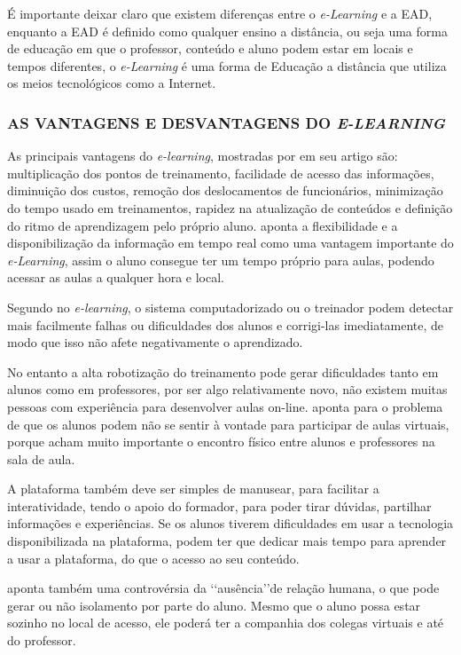 \par
É importante deixar claro que existem diferenças entre o \textit{e-Learning} e a EAD, enquanto a EAD é definido como qualquer ensino a distância, ou seja uma forma de educação em que o professor, conteúdo e aluno podem estar em locais e tempos diferentes, o \textit{e-Learning} é uma forma de Educação a distância que utiliza os meios tecnológicos como a Internet.


\subsubsection{AS VANTAGENS E DESVANTAGENS DO \textit{E-LEARNING}}
As principais vantagens do \textit{e-learning}, mostradas por  em seu artigo são: multiplicação dos pontos de treinamento, facilidade de acesso das informações, diminuição dos custos, remoção dos deslocamentos de funcionários, minimização do tempo usado em treinamentos, rapidez na atualização de conteúdos e definição do ritmo de aprendizagem pelo próprio aluno.
 aponta a flexibilidade e a disponibilização da informação em tempo real como uma vantagem importante do \textit{e-Learning}, assim o aluno consegue ter um tempo próprio para aulas, podendo acessar as aulas a qualquer hora e local.
\par
Segundo \cite[p.~6]{bernardo} no \textit{e-learning}, o sistema computadorizado ou o treinador podem detectar mais facilmente falhas ou dificuldades dos alunos e corrigi-las imediatamente, de modo que isso não afete negativamente o aprendizado.
\par
No entanto a alta robotização do treinamento pode gerar dificuldades tanto em alunos como em professores, por ser algo relativamente novo, não existem muitas pessoas com experiência para desenvolver aulas on-line. \cite[p.~6]{bernardo} aponta para o problema de que os alunos podem não se sentir à vontade para participar de aulas virtuais, porque acham muito importante o encontro físico entre alunos e professores na sala de aula.
\par
A plataforma também deve ser simples de manusear, para facilitar a interatividade, tendo o apoio do formador, para poder tirar dúvidas, partilhar informações e experiências. Se os alunos tiverem dificuldades em usar a tecnologia disponibilizada na plataforma, podem ter que dedicar mais tempo para aprender a usar a plataforma, do que o acesso ao seu conteúdo. 
\par
{} aponta também uma controvérsia da \lq\lq ausência\rq\rq de relação humana, o que pode gerar ou não isolamento por parte do aluno. Mesmo que o aluno possa estar sozinho no local de acesso, ele poderá ter a companhia dos colegas virtuais e até do professor.

